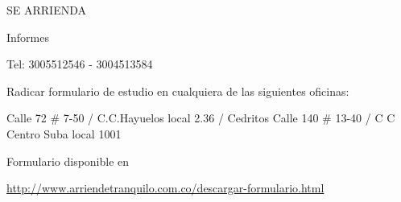 \documentclass[final]{beamer}
  {
}
\date{Jul. 31th, 2007}
\begin{document}
  \begin{frame}
\centering
  \begin{block}
  \centering
      {\VeryHuge \begin{center}
      SE ARRIENDA
      \end{center}}\par
      {\large \begin{center}
      Informes
      \end{center}}\par
      {\Large \begin{center}
      Tel: 3005512546 - 3004513584 \end{center}}\par
      {\footnotesize \begin{center}
      Radicar formulario de estudio en cualquiera de las siguientes oficinas:\end{center}}\par
      {\footnotesize Calle 72 \# 7-50 / C.C.Hayuelos local 2.36  /  Cedritos Calle 140 \# 13-40 / C C Centro Suba   local 1001}\par
      {\footnotesize \begin{center}
      Formulario disponible en
      \end{center}}\par {\footnotesize \url{http://www.arriendetranquilo.com.co/descargar-formulario.html}}\par
  \end{block}
  \end{frame}
\end{document}
